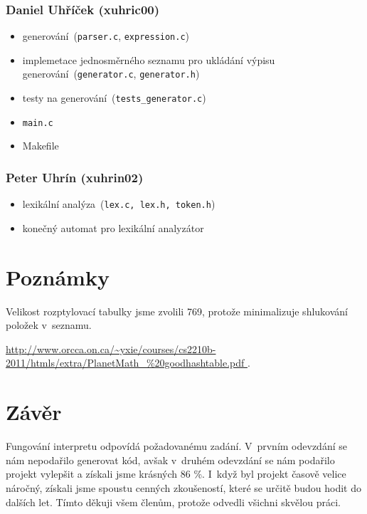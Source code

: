 \documentclass[11pt,a4paper]{article}
\begin{document}
\subsubsection*{Daniel Uhříček (xuhric00)}
\begin{itemize}
\setlength\itemsep{0.3em}
\item generování\ (\verb|parser.c|, \verb|expression.c|) 
\item implemetace jednosměrného seznamu pro ukládání výpisu generování\ (\verb|generator.c|, \verb|generator.h|) 
\item testy na generování\ (\verb|tests_generator.c|) 
\item \verb|main.c| 
\item Makefile
\end{itemize}

\subsubsection*{Peter Uhrín (xuhrin02)} 
\begin{itemize}
\setlength\itemsep{0.3em}
\item lexikální analýza\ (\verb|lex.c, lex.h, token.h|) 
\item konečný automat pro lexikální analyzátor
\end{itemize}


\section{Poznámky}
Velikost rozptylovací tabulky jsme zvolili 769, protože minimalizuje shlukování položek v~seznamu.
\begin{sloppypar}
\url{ http://www.orcca.on.ca/~yxie/courses/cs2210b-2011/htmls/extra/PlanetMath_%20goodhashtable.pdf }.
\end{sloppypar}


\section{Závěr}
Fungování interpretu odpovídá požadovanému zadání. V~prvním odevzdání se nám nepodařilo generovat kód, avšak v~druhém odevzdání se nám podařilo projekt vylepšit a získali jsme krásných 86 \%. I~když byl projekt časově velice náročný, získali jsme spoustu cenných zkoušeností, které se určitě budou hodit do dalších let. Tímto děkuji všem členům, protože odvedli všichni skvělou práci.
\end{document}
